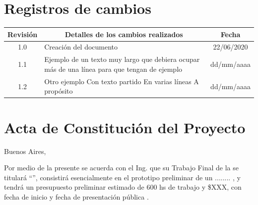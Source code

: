 \documentclass[11pt]{charter}
\begin{document}
\maketitle
\thispagestyle{empty}
\pagebreak


\thispagestyle{empty}
{\setlength{\parskip}{0pt}
\tableofcontents{}
}
\pagebreak


\section{Registros de cambios}
\label{sec:registro}


\begin{table}[ht]
\label{tab:registro}
\centering

\begin{tabularx}{\linewidth}{@{}|c|X|c|@{}}
\hline
\rowcolor[HTML]{C0C0C0} 
Revisión & \multicolumn{1}{c|}{\cellcolor[HTML]{C0C0C0}Detalles de los cambios realizados} & Fecha      \\ \hline
1.0      & Creación del documento                                                          & 22/06/2020 \\ \hline
1.1      & Ejemplo de un texto muy largo que debiera ocupar más de una línea para que tengan de ejemplo                                                                                																						   & dd/mm/aaaa \\ \hline
1.2      & Otro ejemplo \newline
		   Con texto partido \newline
		   En varias líneas \newline
		   A propósito                                                                     & dd/mm/aaaa \\ \hline
\end{tabularx}
\end{table}

\pagebreak



\section{Acta de Constitución del Proyecto}
\label{sec:acta}

\begin{flushright}
Buenos Aires, \fechaINICIOname
\end{flushright}

\vspace{2cm}

Por medio de la presente se acuerda con el Ing. \authorname\hspace{1px} que su Trabajo Final de la \degreename\hspace{1px} se titulará ``\ttitle'', consistirá esencialmente en el prototipo preliminar de un ........ , y tendrá un presupuesto preliminar estimado de 600 hs de trabajo y \$XXX, con fecha de inicio \fechaINICIOname\hspace{1px} y fecha de presentación pública \fechaFINALname.
\end{document}
